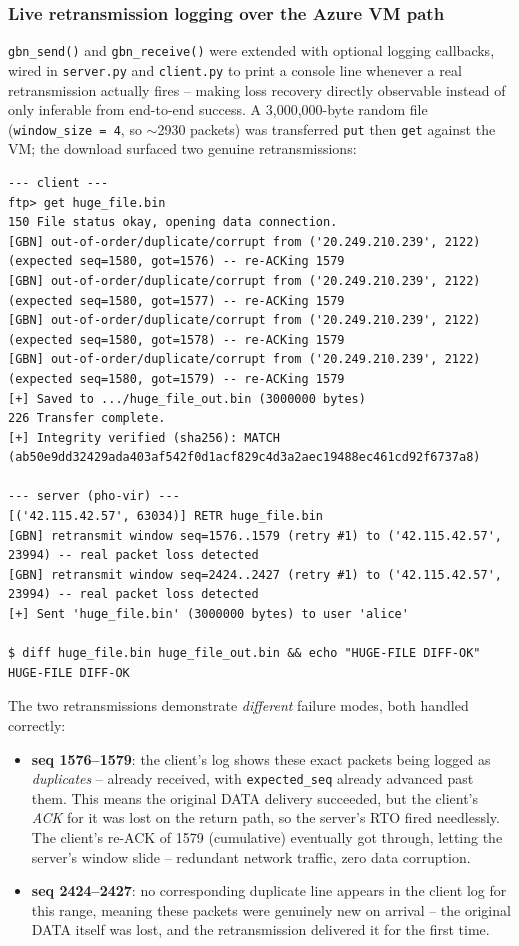 \documentclass[11pt]{article}
\begin{document}
\subsubsection{Live retransmission logging over the Azure VM path}
\texttt{gbn\_send()} and \texttt{gbn\_receive()} were extended with optional
logging callbacks, wired in \texttt{server.py} and \texttt{client.py} to print
a console line whenever a real retransmission actually fires -- making loss
recovery directly observable instead of only inferable from end-to-end
success. A 3{,}000{,}000-byte random file (\texttt{window\_size = 4}, so
$\sim$2930 packets) was transferred \texttt{put} then \texttt{get} against
the VM; the download surfaced two genuine retransmissions:
\begin{lstlisting}
--- client ---
ftp> get huge_file.bin
150 File status okay, opening data connection.
[GBN] out-of-order/duplicate/corrupt from ('20.249.210.239', 2122) (expected seq=1580, got=1576) -- re-ACKing 1579
[GBN] out-of-order/duplicate/corrupt from ('20.249.210.239', 2122) (expected seq=1580, got=1577) -- re-ACKing 1579
[GBN] out-of-order/duplicate/corrupt from ('20.249.210.239', 2122) (expected seq=1580, got=1578) -- re-ACKing 1579
[GBN] out-of-order/duplicate/corrupt from ('20.249.210.239', 2122) (expected seq=1580, got=1579) -- re-ACKing 1579
[+] Saved to .../huge_file_out.bin (3000000 bytes)
226 Transfer complete.
[+] Integrity verified (sha256): MATCH (ab50e9dd32429ada403af542f0d1acf829c4d3a2aec19488ec461cd92f6737a8)

--- server (pho-vir) ---
[('42.115.42.57', 63034)] RETR huge_file.bin
[GBN] retransmit window seq=1576..1579 (retry #1) to ('42.115.42.57', 23994) -- real packet loss detected
[GBN] retransmit window seq=2424..2427 (retry #1) to ('42.115.42.57', 23994) -- real packet loss detected
[+] Sent 'huge_file.bin' (3000000 bytes) to user 'alice'

$ diff huge_file.bin huge_file_out.bin && echo "HUGE-FILE DIFF-OK"
HUGE-FILE DIFF-OK
\end{lstlisting}
The two retransmissions demonstrate \emph{different} failure modes, both
handled correctly:
\begin{itemize}
    \item \textbf{seq 1576--1579}: the client's log shows these exact packets
          being logged as \emph{duplicates} -- already received, with
          \texttt{expected\_seq} already advanced past them. This means the
          original DATA delivery succeeded,
          but the client's \emph{ACK} for it was lost on the return path,
          so the server's RTO fired needlessly. The client's re-ACK of 1579
          (cumulative) eventually got through, letting the server's window
          slide -- redundant network traffic, zero data corruption.
    \item \textbf{seq 2424--2427}: no corresponding duplicate line appears in
          the client log for this range, meaning these packets were
          genuinely new on arrival -- the original DATA itself was lost, and
          the retransmission delivered it for the first time.
\end{itemize}
\end{document}
